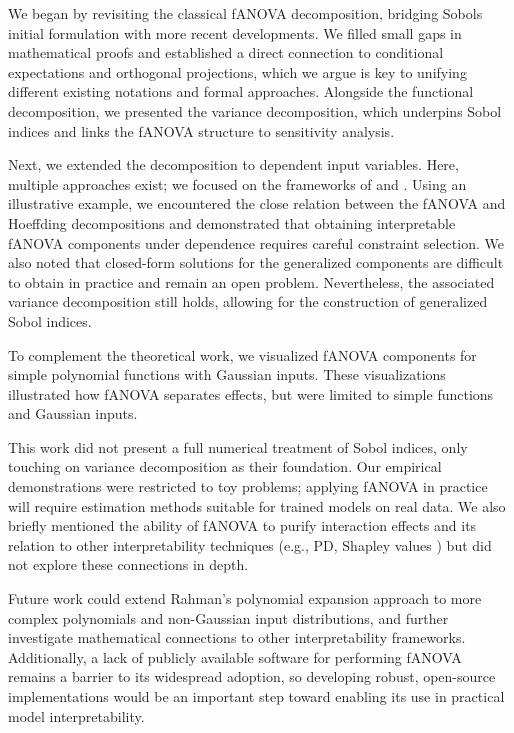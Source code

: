 We began by revisiting the classical fANOVA decomposition, bridging Sobols initial formulation with more recent developments. We filled small gaps in mathematical proofs and established a direct connection to conditional expectations and orthogonal projections, which we argue is key to unifying different existing notations and formal approaches. Alongside the functional decomposition, we presented the variance decomposition, which underpins Sobol indices and links the fANOVA structure to sensitivity analysis.\par

Next, we extended the decomposition to dependent input variables. Here, multiple approaches exist; we focused on the frameworks of \cite{hooker2007} and \cite{rahman2014}. Using an illustrative example, we encountered the close relation between the fANOVA and Hoeffding decompositions and demonstrated that obtaining interpretable fANOVA components under dependence requires careful constraint selection. We also noted that closed-form solutions for the generalized components are difficult to obtain in practice and remain an open problem. Nevertheless, the associated variance decomposition still holds, allowing for the construction of generalized Sobol indices.\par

To complement the theoretical work, we visualized fANOVA components for simple polynomial functions with Gaussian inputs. These visualizations illustrated how fANOVA separates effects, but were limited to simple functions and Gaussian inputs.\par

This work did not present a full numerical treatment of Sobol indices, only touching on variance decomposition as their foundation. Our empirical demonstrations were restricted to toy problems; applying fANOVA in practice will require estimation methods suitable for trained models on real data. We also briefly mentioned the ability of fANOVA to purify interaction effects \citep{lengerich2020} and its relation to other interpretability techniques (e.g., PD, Shapley values \citep{fumagalli2025}) but did not explore these connections in depth.\par

Future work could extend Rahman’s polynomial expansion approach to more complex polynomials and non-Gaussian input distributions, and further investigate mathematical connections to other interpretability frameworks.
Additionally, a lack of publicly available software for performing fANOVA remains a barrier to its widespread adoption, so developing robust, open-source implementations would be an important step toward enabling its use in practical model interpretability.

